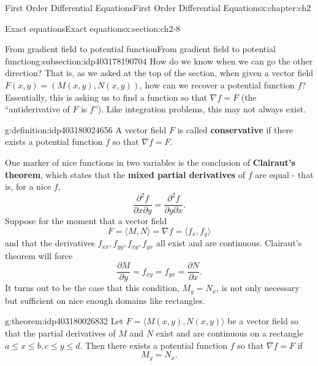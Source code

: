 \documentclass[oneside,10pt,]{book}
\newcommand{\terminology}[1]{\textbf{#1}}
\numberwithin{equation}{section}
\numberwithin{equation}{section}
\begin{document}
\begin{chapterptx}{First Order Differential Equations}{}{First Order Differential Equations}{}{}{x:chapter:ch2}
\begin{sectionptx}{Exact equations}{}{Exact equations}{}{}{x:section:ch2-8}
%
%
\typeout{************************************************}
\typeout{************************************************}
%
\begin{subsectionptx}{From gradient field to potential function}{}{From gradient field to potential function}{}{}{g:subsection:idp403178190704}
How do we know when we can go the other direction? That is, as we asked at the top of the section, when given a vector field \(F(x,y) = (M(x,y), N(x,y))\), how can we recover a potential function \(f\)? Essentially, this is asking us to find a function so that \(\nabla f = F\) (the ``antiderivative of \(F\) is \(f\)''). Like integration problems, this may not always exist.%
\begin{definition}{}{g:definition:idp403180024656}%
A vector field \(F\) is called \terminology{conservative} if there exists a potential function \(f\) so that \(\nabla f = F\).%
\end{definition}
One marker of nice functions in two variables is the conclusion of \terminology{Clairaut's theorem}, which states that the \terminology{mixed partial derivatives} of \(f\) are equal - that is, for a nice \(f\),%
\begin{equation*}
\frac{\partial^2 f}{\partial x \partial y} = \frac{\partial^2 f}{\partial y \partial x}.
\end{equation*}
Suppose for the moment that a vector field%
\begin{equation*}
F = \langle M, N \rangle = \nabla f = \langle f_x, f_y \rangle
\end{equation*}
and that the derivatives \(f_{xx}, f_{yy}, f_{xy}, f_{yx}\) all exist and are continuous. Clairaut's theorem will force%
\begin{equation*}
\frac{\partial M}{\partial y} = f_{xy} = f_{yx} = \frac{\partial N}{\partial x}\text{.}
\end{equation*}
It turns out to be the case that this condition, \(M_y = N_x\), is not only necessary but sufficient on nice enough domains like rectangles.%
\begin{theorem}{}{}{g:theorem:idp403180026832}%
Let \(F = \langle M(x,y), N(x,y) \rangle\) be a vector field so that the partial derivatives of \(M\) and \(N\) exist and are continuous on a rectangle \(a \leq x \leq b, c \leq y \leq d\). Then there exists a potential function \(f\) so that \(\nabla f = F\) if%
\begin{equation*}
M_y = N_x.
\end{equation*}

\end{theorem}
\end{subsectionptx}
\end{sectionptx}
\end{chapterptx}
\end{document}
